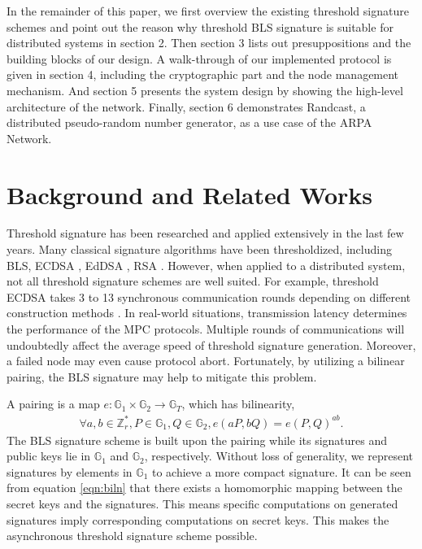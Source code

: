 \documentclass[11pt]{article}
\begin{document}
In the remainder of this paper, we first overview the existing threshold signature schemes and point out the reason why threshold BLS signature is suitable for distributed systems in section 2. Then section 3 lists out presuppositions and the building blocks of our design. A walk-through of our implemented protocol is given in section 4, including the cryptographic part and the node management mechanism. And section 5 presents the system design by showing the high-level architecture of the network. Finally, section 6 demonstrates Randcast, a distributed pseudo-random number generator, as a use case of the ARPA Network.

\section{Background and Related Works}

Threshold signature has been researched and applied extensively in the last few years. Many classical signature algorithms have been thresholdized, including BLS, ECDSA \cite{gennaro2018fast}, EdDSA \cite{stinson2001provably}, RSA \cite{damgaard2001practical}. However, when applied to a distributed system, not all threshold signature schemes are well suited. For example, threshold ECDSA takes 3 to 13 synchronous communication rounds depending on different construction methods \cite{aumasson2020survey}. In real-world situations, transmission latency determines the performance of the MPC protocols. Multiple rounds of communications will undoubtedly affect the average speed of threshold signature generation. Moreover, a failed node may even cause protocol abort. Fortunately, by utilizing a bilinear pairing, the BLS signature may help to mitigate this problem.

A pairing is a map $e:\mathbb{G}_1 \times \mathbb{G}_2 \to \mathbb{G}_T$, which has bilinearity, 
\begin{align}\label{eqn:biln}
    \forall a,b \in \mathbb{Z}_r^*, P \in \mathbb{G}_1, Q \in \mathbb{G}_2, e(aP,bQ)=e(P,Q)^{ab}.
\end{align}
The BLS signature scheme is built upon the pairing while its signatures and public keys lie in $\mathbb{G}_1$ and $\mathbb{G}_2$, respectively. Without loss of generality, we represent signatures by elements in $\mathbb{G}_1$ to achieve a more compact signature. It can be seen from equation \ref{eqn:biln} that there exists a homomorphic mapping between the secret keys and the signatures. This means specific computations on generated signatures imply corresponding computations on secret keys. This makes the asynchronous threshold signature scheme possible.
\end{document}
